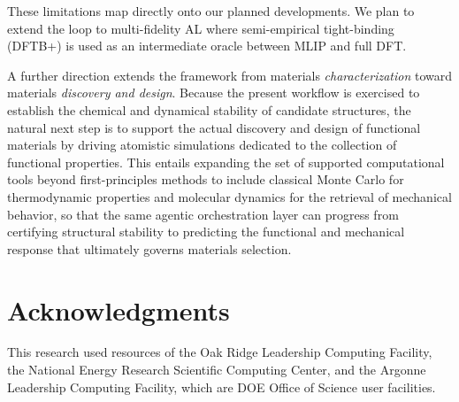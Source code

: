 \documentclass[conference]{IEEEtran}
\def\ac#1{#1}%
\def\acs#1{#1}%
\begin{document}
These limitations map directly onto our planned developments. We plan to
extend the loop to multi-fidelity \acs{AL} where semi-empirical
tight-binding (\ac{DFTB}+) is used as an intermediate oracle between \acs{MLIP}
and full \acs{DFT}.

A further direction extends the framework from materials \emph{characterization}
toward materials \emph{discovery and design}. Because the present workflow is
exercised to establish the chemical and dynamical stability of candidate
structures, the natural next step is to support the actual discovery and design
of functional materials by driving atomistic simulations dedicated to the
collection of functional properties. This entails expanding the set of supported
computational tools beyond first-principles methods to include classical Monte
Carlo for thermodynamic properties and molecular dynamics for the retrieval of
mechanical behavior, so that the same agentic orchestration layer can progress
from certifying structural stability to predicting the functional and mechanical
response that ultimately governs materials selection.

\section*{Acknowledgments}
This research used resources of the Oak Ridge Leadership Computing Facility,
the National Energy Research Scientific Computing Center, and the Argonne
Leadership Computing Facility, which are \acs{DOE} Office of Science user facilities.



\end{document}
